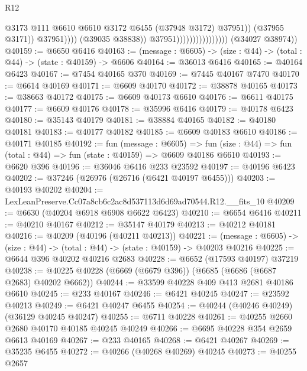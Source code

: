\begin{lexlean}{R12}
\begin{coremodule}
                                                      @3173
                                                      @111
                                                      @6610
                                                      @6610
                                                      @3172
                                                      @6455
                                                      (@37948 @3172)
                                                      @37951))
                                                  (@37955 @3171))
                                                @37951))))
                                        (@39035 @38838))
                                      @37951))))))))))))))))
      (@34027 @38974))
@40159 := @6650 @6416
@40163 := (message : @6605) -> (size : @44) -> (total : @44) -> (state : @40159) -> @6606
@40164 := @36013 @6416
@40165 := @40164 @6423
@40167 := @7454 @40165 @370
@40169 := @7445 @40167 @7470
@40170 := @6614 @40169
@40171 := @6609 @40170
@40172 := @38878 @40165
@40173 := @38663 @40172
@40175 := @6609 @40173 @6610
@40176 := @6611 @40175
@40177 := @6609 @40176
@40178 := @35996 @6416
@40179 := @40178 @6423
@40180 := @35143 @40179
@40181 := @38884 @40165
@40182 := @40180 @40181
@40183 := @40177 @40182
@40185 := @6609 @40183 @6610
@40186 := @40171 @40185
@40192 := fun (message : @6605) =>
  fun (size : @44) => fun (total : @44) => fun (state : @40159) => @6609 @40186 @6610
@40193 := @6620 @396
@40196 := @36046 @6416 @233 @23592
@40197 := @40196 @6423
@40202 := @37246 (@26976 (@26716 (@6421 @40197 @6455)))
@40203 := @40193 @40202
@40204 := LexLeanPreserve.Cc07a8cb6c2ac8d537113d6d69ad70544.R12.__fits_10
@40209 := @6630 (@40204 @6918 @6908 @6622 @6423)
@40210 := @6654 @6416
@40211 := @40210 @40167
@40212 := @35147 @40179
@40213 := @40212 @40181
@40216 := @40209 (@40196 (@40211 @40213))
@40221 := (message : @6605) -> (size : @44) -> (total : @44) -> (state : @40159) -> @40203 @40216
@40225 := @6644 @396 @40202 @40216 @2683
@40228 := @6652 (@17593 @40197) @37219
@40238 := @40225 @40228 (@6669 (@6679 @396)) (@6685 (@6686 (@6687 @2683) @40202 @6662))
@40244 := @33599 @40228 @409 @413 @2681 @40186 @6610
@40245 := @233 @40167
@40246 := @6421 @40245
@40247 := @23592 @40213
@40249 := @6421 @40247 @6455
@40254 := @40244 (@40246 @40249) (@36129 @40245 @40247)
@40255 := @6711 @40228
@40261 := @40255 @2660 @2680 @40170 @40185 @40245 @40249
@40266 := @6695 @40228 @354 @2659 @6613 @40169
@40267 := @233 @40165
@40268 := @6421 @40267
@40269 := @35235 @6455
@40272 := @40266 (@40268 @40269) @40245
@40273 := @40255 @2657

\end{coremodule}
\end{lexlean}
